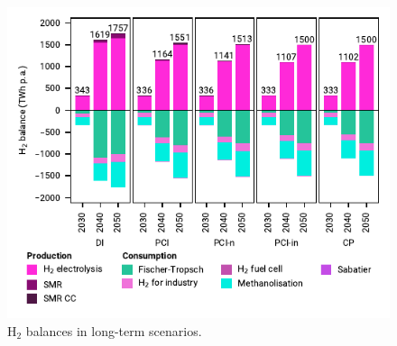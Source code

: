 \documentclass[pdflatex,sn-nature]{sn-jnl}%
\theoremstyle{thmstyleone}%
\theoremstyle{thmstyletwo}%
\theoremstyle{thmstylethree}%
\begin{document}
\begin{figure}[t]
  \centering
  \includegraphics{figures/balances_overview_H2}
  \caption{H$_2$ balances in long-term scenarios.}
  \label{fig:balances_overview_H2}
\end{figure}
\end{document}
